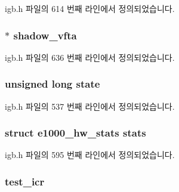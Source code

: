 igb.\+h 파일의 614 번째 라인에서 정의되었습니다.

\subsubsection[{\texorpdfstring{shadow\+\_\+vfta}{shadow_vfta}}]{$\ast$ shadow\+\_\+vfta}\hypertarget{structigb__adapter_aa7c8f797024e977910661594807f2c23}{}\label{structigb__adapter_aa7c8f797024e977910661594807f2c23}


igb.\+h 파일의 636 번째 라인에서 정의되었습니다.

\subsubsection[{\texorpdfstring{state}{state}}]{\setlength{\rightskip}{0pt plus 5cm}unsigned long state}\hypertarget{structigb__adapter_af7504fc0e249186b115eb5f51a297878}{}\label{structigb__adapter_af7504fc0e249186b115eb5f51a297878}


igb.\+h 파일의 537 번째 라인에서 정의되었습니다.

\subsubsection[{\texorpdfstring{stats}{stats}}]{\setlength{\rightskip}{0pt plus 5cm}struct {\bf e1000\+\_\+hw\+\_\+stats} stats}\hypertarget{structigb__adapter_a203279ec85dedcf3113813d967644ee9}{}\label{structigb__adapter_a203279ec85dedcf3113813d967644ee9}


igb.\+h 파일의 595 번째 라인에서 정의되었습니다.

\subsubsection[{\texorpdfstring{test\+\_\+icr}{test_icr}}]{ test\+\_\+icr}\hypertarget{structigb__adapter_a14505f313108586812dd0e3ca17b38b7}{}\label{structigb__adapter_a14505f313108586812dd0e3ca17b38b7}


